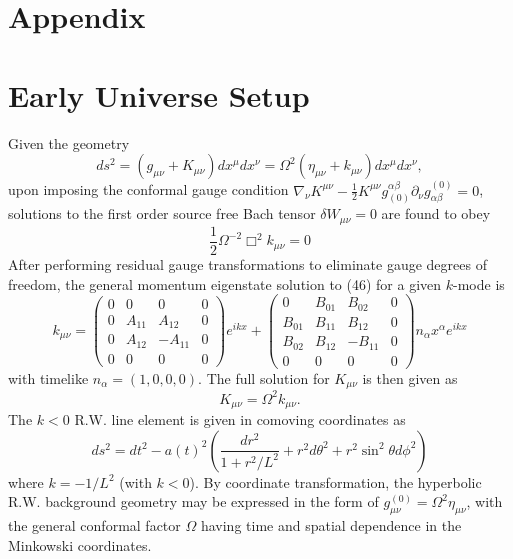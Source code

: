 \documentclass[10pt,letterpaper]{article}
\begin{document}
\section*{Appendix}
\section*{Early Universe Setup}
Given the geometry
\begin{equation}
ds^2 = (g_{\mu\nu} + K_{\mu\nu})dx^\mu dx^\nu = \Omega^2(\eta_{\mu\nu} + k_{\mu\nu})dx^\mu dx^\nu,
\end{equation}
upon imposing the conformal gauge condition $\nabla_\nu K^{\mu\nu} - \frac12 K^{\mu\nu} g^{\alpha\beta}_{(0)}\partial_\nu g_{\alpha\beta}^{(0)}=0$, 
solutions to the first order source free Bach tensor $\delta W_{\mu\nu} = 0$ are found to obey
\begin{equation}
\frac{1}{2}\Omega^{-2}\Box^2 k_{\mu\nu} = 0
\end{equation}
After performing residual gauge transformations to eliminate gauge degrees of freedom, the general momentum eigenstate solution to (46) for a given $k$-mode is 
\begin{equation}
k_{\mu\nu} = 
 \begin{pmatrix}0&0&0&0\\0&A_{11}&A_{12}&0\\0&A_{12}&-A_{11}&0\\0&0&0&0\end{pmatrix}e^{ikx} + \begin{pmatrix}
0&B_{01}&B_{02}&0\\B_{01}&B_{11}&B_{12}&0\\B_{02}&B_{12}&-B_{11}&0\\0&0&0&0  \end{pmatrix}n_\alpha x^\alpha e^{ikx} 
\end{equation}
with timelike $n_\alpha = (1,0,0,0)$. The full solution for $K_{\mu\nu}$ is then given as
\begin{equation}
K_{\mu\nu} = \Omega^2 k_{\mu\nu}.
\end{equation}
The $k<0$ R.W. line element is given in comoving coordinates as
\begin{equation}
ds^2 = dt^2 - a(t)^2 \left(  \frac{dr^2}{1+r^2/L^2} + r^2 d\theta^2 + r^2\sin^2\theta d\phi^2 \right)
\end{equation}
where $k = -1/L^2$ (with $k<0$). By coordinate transformation, the hyperbolic R.W. background geometry may be expressed in the form of $g_{\mu\nu}^{(0)} = \Omega^2 \eta_{\mu\nu}$, with the general conformal factor $\Omega$ having time and spatial dependence in the Minkowski coordinates. 
\end{document}

